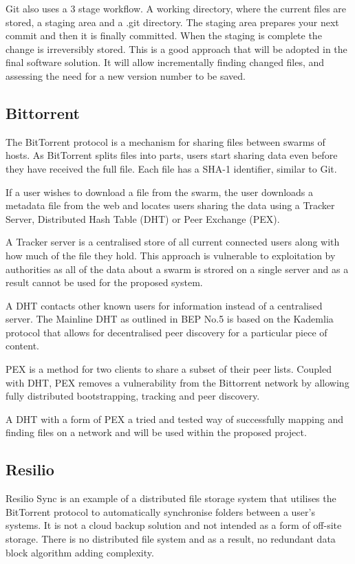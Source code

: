 \documentclass[a4paper, 11pt, twocolumn, twoside]{report}
\begin{document}
Git also uses a 3 stage workflow. A working directory, where the current files are stored, a staging area and a .git directory. The staging area prepares your next commit and then it is finally committed. When the staging is complete the change is irreversibly stored. This is a good approach that will be adopted in the final software solution. It will allow incrementally finding changed files, and assessing the need for a new version number to be saved.


\subsection{Bittorrent}
The BitTorrent protocol is a mechanism for sharing files between swarms of hosts. As BitTorrent splits files into parts, users start sharing data even before they have received the full file. Each file has a SHA-1 identifier, similar to Git. \citep{qiu2004modeling}

If a user wishes to download a file from the swarm, the user downloads a metadata file from the web and locates users sharing the data using a Tracker Server, Distributed Hash Table (DHT) or Peer Exchange (PEX). \citep{cohen2008bittorrent}

A Tracker server is a centralised store of all current connected users along with how much of the file they hold. This approach is vulnerable to exploitation by authorities as all of the data about a swarm is strored on a single server and as a result cannot be used for the proposed system.

A DHT contacts other known users for information instead of a centralised server. The Mainline DHT as outlined in BEP No.5 is based on the Kademlia protocol that allows for decentralised peer discovery for a particular piece of content.

PEX is a method for two clients to share a subset of their peer lists. Coupled with DHT, PEX removes a vulnerability from the Bittorrent network by allowing fully distributed bootstrapping, tracking and peer discovery.

A DHT with a form of PEX a tried and tested way of successfully mapping and finding files on a network and will be used within the proposed project.

\subsection{Resilio}
Resilio Sync is an example of a distributed file storage system that utilises the BitTorrent protocol to automatically synchronise folders between a user’s systems. It is not a cloud backup solution and not intended as a form of off-site storage. There is no distributed file system and as a result, no redundant data block algorithm adding complexity. \citep{farina2014bittorrent}
\end{document}
